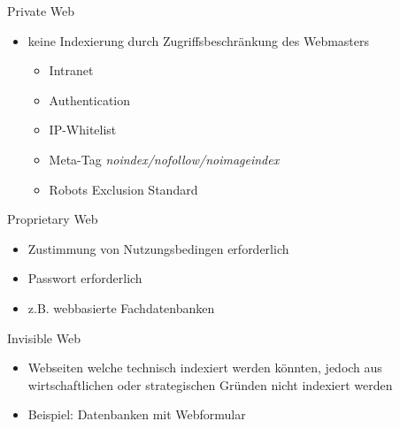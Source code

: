 \documentclass[12pt]{beamer}
\begin{document}
\begin{frame}{Private Web}
	\begin{itemize}
		\item keine Indexierung durch Zugriffsbeschränkung des Webmasters 
		\begin{itemize}
			\item Intranet
			\item Authentication
			\item IP-Whitelist
			\item Meta-Tag \textit{noindex/nofollow/noimageindex}
			\item \glqq Robots Exclusion Standard\grqq
		\end{itemize}	
	\end{itemize}
\end{frame}

\begin{frame}{Proprietary Web}
	\begin{itemize}
		\item Zustimmung von Nutzungsbedingen erforderlich
		\item Passwort erforderlich
		\item z.B. webbasierte Fachdatenbanken
	\end{itemize}
\end{frame}

\begin{frame}{Invisible Web}
	\begin{itemize}
		\item Webseiten welche technisch indexiert werden könnten, jedoch aus wirtschaftlichen oder strategischen Gründen nicht indexiert werden
		\item Beispiel: Datenbanken mit Webformular
	\end{itemize}
\end{frame}
\end{document}
